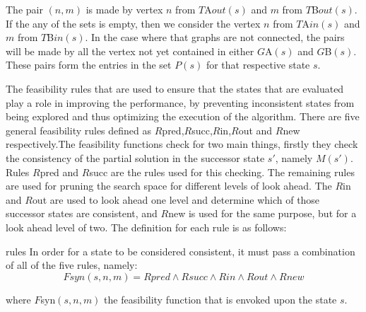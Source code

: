 The pair $(n,m)$ is made by vertex $n$ from $T${\tiny A}$out(s)$ and $m$ from $T${\tiny B}$out(s)$. If the any of the sets is empty, then we consider the vertex $n$ from $T${\tiny A}$in(s)$ and $m$ from $T${\tiny B}$in(s)$. In the case where that graphs are not connected, the pairs will be made by all the vertex not yet contained in either $G${\tiny A}$(s)$ and $G${\tiny B}$(s)$. These pairs form the entries in the set $P(s)$ for that respective state $s$.

The feasibility rules that are used to ensure that the states that are evaluated play a role in improving the performance, by preventing inconsistent states from being explored and thus optimizing the execution of the algorithm. There are five general feasibility rules defined as $R${\tiny pred},$R${\tiny succ},$R${\tiny in},$R${\tiny out} and $R${\tiny new} respectively.\newline\newline The feasibility functions check for two main things, firstly they check the consistency of the partial solution in the successor state $s'$, namely $M(s')$. Rules $R${\tiny pred} and $R${\tiny succ} are the rules used for this checking.\newline
The remaining rules are used for pruning the search space for different levels of look ahead. The $R${\tiny in} and $R${\tiny out} are used to look ahead one level and determine which of those successor states are consistent, and $R${\tiny new} is used for the same purpose, but for a look ahead level of two. The definition for each rule is as follows:


{rules}
\newpage
In order for a state to be considered consistent, it must pass a combination of all of the five rules, namely:
	\begin{equation}
		Fsyn(s,n,m) = Rpred \wedge Rsucc \wedge Rin \wedge Rout \wedge Rnew 
	\end{equation} 

where $F${\tiny syn}$(s,n,m)$ the feasibility function that is envoked upon the state $s$.

